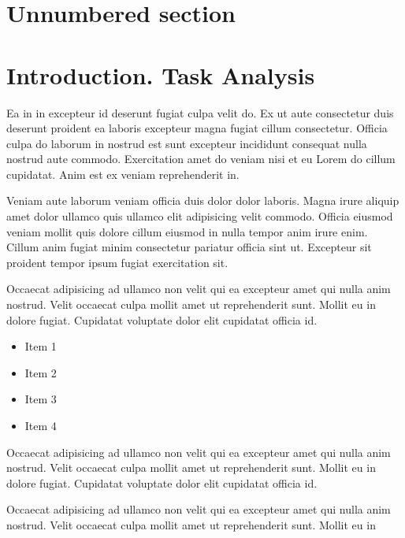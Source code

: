 \documentclass{thesis}
\begin{document}




\setcounter{secnumdepth}{0}
\section{Unnumbered section}
\setcounter{secnumdepth}{1}

\section{Introduction. Task Analysis}

Ea in in excepteur id deserunt fugiat culpa velit do. Ex ut aute consectetur
duis deserunt proident ea laboris excepteur magna fugiat cillum consectetur.
Officia culpa do laborum in nostrud est sunt excepteur incididunt consequat
nulla nostrud aute commodo. Exercitation amet do veniam nisi et eu Lorem do
cillum cupidatat. Anim est ex veniam reprehenderit in.

Veniam aute laborum veniam officia duis dolor dolor laboris. Magna irure aliquip
amet dolor ullamco quis ullamco elit adipisicing velit commodo. Officia eiusmod
veniam mollit quis dolore cillum eiusmod in nulla tempor anim irure enim. Cillum
anim fugiat minim consectetur pariatur officia sint ut. Excepteur sit proident
tempor ipsum fugiat exercitation sit.

Occaecat adipisicing ad ullamco non velit qui ea excepteur amet qui nulla anim
nostrud. Velit occaecat culpa mollit amet ut reprehenderit sunt. Mollit eu in
dolore fugiat. Cupidatat voluptate dolor elit cupidatat officia id.

\begin{itemize}
    \item Item 1
    \item Item 2
    \item Item 3
    \item Item 4
\end{itemize}

Occaecat adipisicing ad ullamco non velit qui ea excepteur amet qui nulla anim
nostrud. Velit occaecat culpa mollit amet ut reprehenderit sunt. Mollit eu in
dolore fugiat. Cupidatat voluptate dolor elit cupidatat officia id.

Occaecat adipisicing ad ullamco non velit qui ea excepteur amet qui nulla anim
nostrud. Velit occaecat culpa mollit amet ut reprehenderit sunt. Mollit eu in
\end{document}
